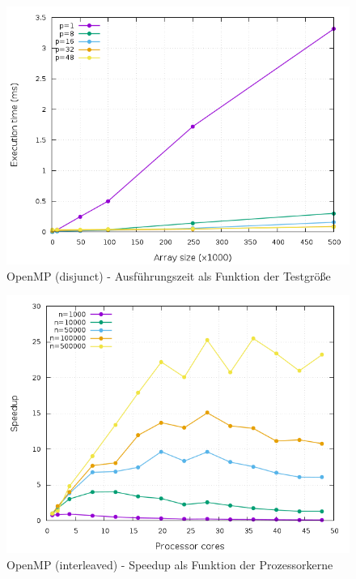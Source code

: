 \begin{figure}[p]
	\centering
	\includegraphics[width=404pt]{resources/plots/OpenMP_Disjunct_cores.png}
	\caption{OpenMP (disjunct) - Ausführungszeit als Funktion der Testgröße}
	\label{OpenMP_Disjunct_cores}
\end{figure}

\begin{figure}[p]
	\centering
	\includegraphics[width=404pt]{resources/plots/OpenMP_Interleaved_sizes.png}
	\caption{OpenMP (interleaved) - Speedup als Funktion der Prozessorkerne}
	\label{OpenMP_Interleaved_sizes}
\end{figure}

